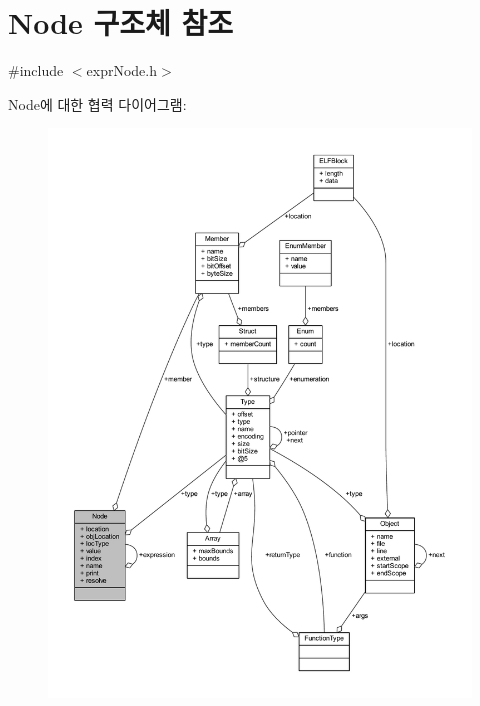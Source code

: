 \hypertarget{struct_node}{}\section{Node 구조체 참조}
\label{struct_node}


{\ttfamily \#include $<$expr\+Node.\+h$>$}



Node에 대한 협력 다이어그램\+:\nopagebreak
\begin{figure}[H]
\begin{center}
\leavevmode
\includegraphics[width=350pt]{struct_node__coll__graph}
\end{center}
\end{figure}
